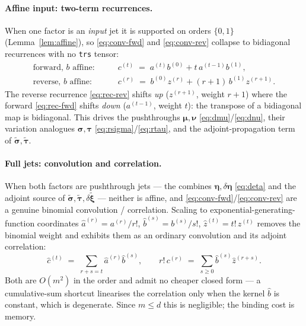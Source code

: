 \documentclass[11pt]{article}
\theoremstyle{definition}
\theoremstyle{plain}
\begin{document}
\paragraph{Affine input: two-term recurrences.}
When one factor is an \emph{input} jet it is supported on orders $\{0,1\}$ (Lemma~\ref{lem:affine}), so
\eqref{eq:conv-fwd} and \eqref{eq:conv-rev} collapse to bidiagonal recurrences with no \texttt{trs}
tensor:
\begin{align}
  \text{forward, } b \text{ affine:} \qquad & c^{(t)} \;=\; a^{(t)} b^{(0)} + t\, a^{(t-1)} b^{(1)},
  \label{eq:rec-fwd}\\
  \text{reverse, } b \text{ affine:} \qquad & c^{(r)} \;=\; b^{(0)} z^{(r)} + (r+1)\, b^{(1)} z^{(r+1)}.
  \label{eq:rec-rev}
\end{align}
The reverse recurrence \eqref{eq:rec-rev} shifts \emph{up} ($z^{(r+1)}$, weight $r{+}1$) where the
forward \eqref{eq:rec-fwd} shifts \emph{down} ($a^{(t-1)}$, weight $t$): the transpose of a bidiagonal
map is bidiagonal. This drives the pushthroughs $\boldsymbol\mu,\boldsymbol\nu$
\eqref{eq:dmu}/\eqref{eq:dnu}, their variation analogues $\boldsymbol\sigma,\boldsymbol\tau$
\eqref{eq:rsigma}/\eqref{eq:rtau}, and the adjoint-propagation term of $\widetilde{\boldsymbol\sigma},
\widetilde{\boldsymbol\tau}$.

\paragraph{Full jets: convolution and correlation.}
When both factors are pushthrough jets --- the combines $\boldsymbol\eta,\delta\boldsymbol\eta$
\eqref{eq:deta} and the adjoint source of $\widetilde{\boldsymbol\sigma},\widetilde{\boldsymbol\tau},
\delta\widetilde{\boldsymbol\xi}$ --- neither is affine, and \eqref{eq:conv-fwd}/\eqref{eq:conv-rev} are
a genuine binomial convolution / correlation. Scaling to exponential-generating-function coordinates
$\hat a^{(r)} = a^{(r)}/r!$, $\hat b^{(s)} = b^{(s)}/s!$, $\hat z^{(t)} = t!\,z^{(t)}$ removes the
binomial weight and exhibits them as an ordinary convolution and its adjoint correlation:
\begin{equation}
  \hat c^{(t)} \;=\; \sum_{r+s=t} \hat a^{(r)} \hat b^{(s)}, \qquad
  r!\,c^{(r)} \;=\; \sum_{s \ge 0} \hat b^{(s)} \hat z^{(r+s)} .
  \label{eq:egf}
\end{equation}
Both are $O(m^2)$ in the order and admit no cheaper closed form --- a cumulative-sum shortcut linearises
the correlation only when the kernel $\hat b$ is constant, which is degenerate. Since $m \le d$ this is
negligible; the binding cost is memory.
\end{document}
